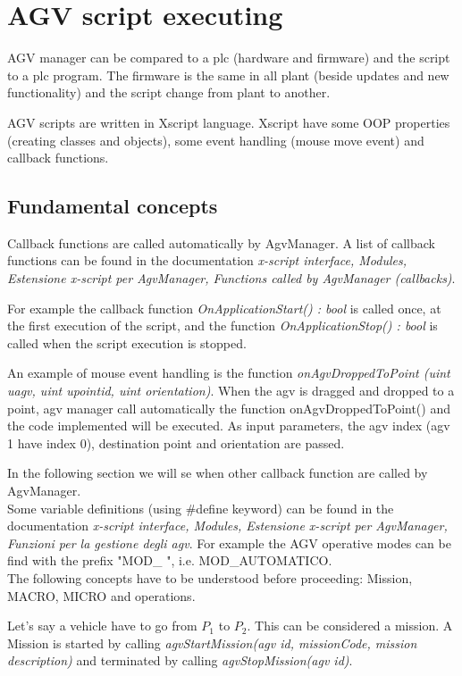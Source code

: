 \section{AGV script executing}
AGV manager can be compared to a plc (hardware and firmware) and the script to a plc program. The firmware is the same in all plant (beside updates and new functionality) and the script change from plant to another.

AGV scripts are written in Xscript language. Xscript have some OOP properties (creating classes and objects), some event handling (mouse move event) and callback functions.

\subsection{Fundamental concepts}
Callback functions are called automatically by AgvManager. A list of callback functions can be found in the documentation \textit{x-script interface, Modules, Estensione x-script per AgvManager, Functions called by AgvManager (callbacks)}.

For example the callback function \textit{OnApplicationStart() : bool} is called once, at the first execution of the script, and the function \textit{OnApplicationStop() : bool} is called when the script execution is stopped.

An example of mouse event handling is the function \textit{onAgvDroppedToPoint (uint uagv, uint upointid, uint orientation)}.
When the agv is dragged and dropped to a point, agv manager call automatically the function onAgvDroppedToPoint() and the code implemented will be executed. As input parameters, the agv index (agv 1 have index 0), destination point and orientation are passed.

In the following section we will se when other callback function are called by AgvManager.\\

Some variable definitions (using \#define keyword) can be found in the documentation \textit{x-script interface, Modules, Estensione x-script per AgvManager, Funzioni per la gestione degli agv}. For example the AGV operative modes can be find with the prefix "MOD\_ ", i.e. MOD\_AUTOMATICO.\\

The following concepts have to be understood before proceeding: Mission, MACRO, MICRO and operations.

Let's say a vehicle have to go from $P_{1}$ to $P_{2}$. This can be considered a mission. A Mission is started by calling \textit{agvStartMission(agv id, missionCode, mission description)} and terminated by calling \textit{agvStopMission(agv id)}.

